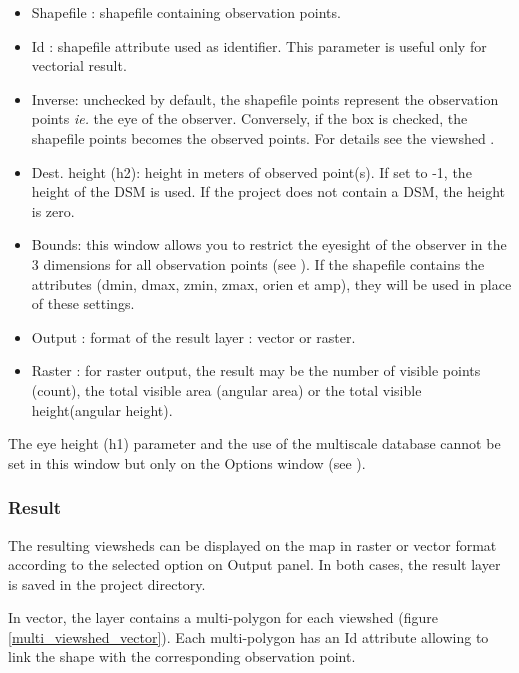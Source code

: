 \documentclass{report}
\begin{document}
\begin{itemize}
	\item Shapefile : shapefile containing observation points.
	\item Id : shapefile attribute used as identifier. This parameter is useful only for vectorial result.
	\item Inverse: unchecked by default, the shapefile points represent the observation points \textit{ie.} the eye of the observer. Conversely, if the box is checked, the shapefile points becomes the observed points. For details see the viewshed .
	\item Dest. height (h2): height in meters of observed point(s). If set to -1, the height of the DSM is used. If the project does not contain a DSM, the height is zero.
	\item Bounds: this window allows you to restrict the eyesight of the observer in the 3 dimensions for all observation points (see ). If the shapefile contains the attributes (dmin, dmax, zmin, zmax, orien et amp), they will be used in place of these settings.
	\item Output : format of the result layer : vector or raster.
	\item Raster : for raster output, the result may be the number of visible points (count), the total visible area (angular area) or the total visible height(angular height).
\end{itemize}

The eye height (h1) parameter and the use of the multiscale database cannot be set in this window but only on the Options window (see ).

\subsubsection{Result}
The resulting viewsheds can be displayed on the map in raster or vector format according to the selected option on Output panel. In both cases, the result layer is saved in the project directory.

In vector, the layer contains a multi-polygon for each viewshed (figure \ref{multi_viewshed_vector}). Each multi-polygon has an Id attribute allowing to link the shape with the corresponding observation point.
\end{document}
